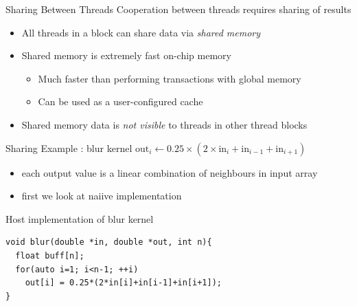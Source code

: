 \begin{frame}[fragile]{Sharing Between Threads}
        Cooperation between threads requires sharing of results
        \begin{itemize}
            \item All threads in a block can share data via \emph{shared memory}
            \item Shared memory is extremely fast on-chip memory
            \begin{itemize}
                \item Much faster than performing transactions with global memory
                \item Can be used as a user-configured cache
            \end{itemize}
            \item Shared memory data is \emph{not visible} to threads in other thread blocks
        \end{itemize}

\end{frame}

\begin{frame}[fragile]{Sharing Example : blur kernel}
    $\text{out}_i \leftarrow 0.25\times(2\times\text{in}_i+\text{in}_{i-1}+\text{in}_{i+1})$
    \begin{info}{}
        \begin{itemize}
            \item each output value is a linear combination of neighbours in input array
            \item first we look at naiive implementation
        \end{itemize}
    \end{info}

    \begin{code}{Host implementation of blur kernel}
        \begin{lstlisting}[style=boxcudatiny]
void blur(double *in, double *out, int n){
  float buff[n];
  for(auto i=1; i<n-1; ++i)
    out[i] = 0.25*(2*in[i]+in[i-1]+in[i+1]);
}
        \end{lstlisting}
    \end{code}

\end{frame}

